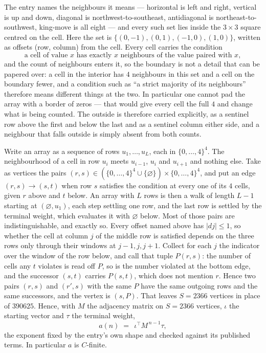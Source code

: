 \documentclass[11pt,a4paper]{article}
\theoremstyle{plain}
\theoremstyle{definition}
\begin{document}
The entry names the neighbours it means --- horizontal is left and right, vertical is up and
down, diagonal is northwest-to-southeast, antidiagonal is northeast-to-southwest, king-move is
all eight --- and every such set lies inside the $3\times3$ square centred on the cell. Here
the set is $\{(0,-1), (0,1), (-1,0), (1,0)\}$, written as offsets (row, column) from the cell. Every cell carries
the condition
\[
\text{a cell of value }x\text{ has exactly }x\text{ neighbours of the value paired with }x,
\]
and the count of neighbours enters it, so the boundary is not a detail that can be papered
over: a cell in the interior has $4$ neighbours in this set and a cell on the boundary
fewer, and a condition such as ``a strict majority of its neighbours'' therefore means
different things at the two. In particular one cannot pad the array with a border of zeros ---
that would give every cell the full $4$ and change what is being counted. The outside is
therefore carried
explicitly, as a sentinel row above the first and below the last and as a sentinel column
either side, and a neighbour that falls outside is simply absent from both counts.

Write an array as a sequence of rows $u_1,\dots,u_L$, each in
$\{0,\dots,4\}^{4}$. The neighbourhood of a cell in row $u_i$ meets $u_{i-1}$,
$u_i$ and $u_{i+1}$ and nothing else. Take as vertices the pairs
$(r,s)\in(\{0,\dots,4\}^{4}\cup\{\varnothing\})\times\{0,\dots,4\}^{4}$,
and put an edge $(r,s)\to(s,t)$ when row $s$ satisfies the condition at every one of its
$4$ cells, given $r$ above and $t$ below. An array with $L$ rows is then a walk of length
$L-1$ starting at $(\varnothing,u_1)$, each step settling one row, and the last row is
settled by the terminal weight, which evaluates it with $\varnothing$ below. Most of those pairs are indistinguishable, and exactly so. Every offset named above has $|dj|\le 1$, so whether the cell at column $j$ of the middle row is satisfied depends on the three rows only through their windows at $j-1,j,j+1$. Collect for each $j$ the indicator over the window of the row below, and call that tuple $P(r,s)$: the number of cells any $t$ violates is read off $P$, so is the number violated at the bottom edge, and the successor $(s,t)$ carries $P(s,t)$, which does not mention $r$. Hence two pairs $(r,s)$ and $(r',s)$ with the same $P$ have the same outgoing rows and the same successors, and the vertex is $(s,P)$. That leaves $S=2366$ vertices in place of $390625$. Hence,
with $M$ the adjacency matrix on $S=2366$ vertices, $\iota$ the starting vector and $\tau$ the
terminal weight,
\[
a(n)\;=\;\,\iota^{\!\top}M^{\,n-1}\tau ,
\]
the exponent fixed by the entry's own shape and checked against its published terms. In
particular $a$ is $C$-finite.
\end{document}
